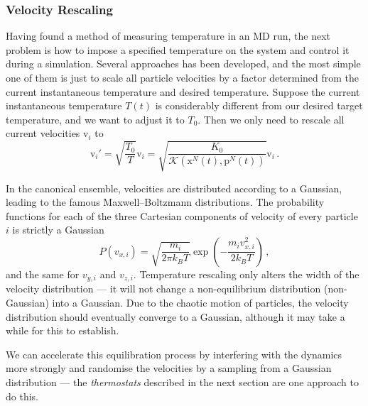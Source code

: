 \documentclass{article}
\theoremstyle{plain}\theoremheaderfont{\normalfont\itshape}\theorembodyfont{\rmfamily}\theoremseparator{.}\newtheorem*{rem}{Remark}\newtheorem*{ex}{Example}\newtheorem*{proof}{Proof}\newtheorem*{altp}{Alternative proof}
\theoremstyle{plain}\theoremheaderfont{\normalfont\bfseries}\theorembodyfont{\rmfamily}\theoremseparator{.}\newtheorem{thm}{Theorem}[section]\newtheorem{lem}[thm]{Lemma}\newtheorem{prop}[thm]{Proposition}\newtheorem*{cor}{Corollary}\newtheorem{defn}[thm]{Definition}\newtheorem{clm}[thm]{Claim}\newtheorem{clminproof}{Claim}\newtheorem{alg}[thm]{Algorithm}\newtheorem{hyp}[thm]{Hypothesis}\newtheorem{law}[thm]{Law}
\theoremstyle{break}\theoremheaderfont{\normalfont\itshape}\theorembodyfont{\rmfamily}\theoremseparator{.\medskip}\newtheorem*{proofskip}{Proof}\newtheorem*{exs}{Examples}\newtheorem*{rems}{Remarks}
\theoremstyle{break}\theoremheaderfont{\normalfont\bfseries}\theorembodyfont{\rmfamily}\theoremseparator{.\medskip}\newtheorem{lemskip}[thm]{Lemma}\newtheorem{defnskip}[thm]{Definition}\newtheorem{propskip}[thm]{Proposition}\newtheorem{thmskip}[thm]{Theorem}
\numberwithin{equation}{section}
\newcommand{\vb}[1]{\bm{\mathrm{#1}}}
\begin{document}
    \subsubsection{Velocity Rescaling}
    Having found a method of measuring temperature in an MD run, the next problem is how to impose a specified temperature on the system and control it during a simulation. Several approaches has been developed, and the most simple one of them is just to scale all particle velocities by a factor determined from the current instantaneous temperature and desired temperature. Suppose the current instantaneous temperature \(T(t)\) is considerably different from our desired target temperature, and we want to adjust it to \(T_0\). Then we only need to rescale all current velocities \(\vb{v}_i\) to
    \begin{equation}
        \vb{v}_i'=\sqrt{\frac{T_0}{T}}\vb{v}_i=\sqrt{\frac{K_0}{\mathcal{K}(\vb{x}^N(t),\vb{p}^N(t))}}\vb{v}_i\,.
    \end{equation}

    In the canonical ensemble, velocities are distributed according to a Gaussian, leading to the famous Maxwell--Boltzmann distributions. The probability functions for each of the three Cartesian components of velocity of every particle \(i\) is strictly a Gaussian
    \begin{equation}
        P(v_{x,i})=\sqrt{\frac{m_i}{2\pi k_B T}}\exp\left(-\frac{m_i v_{x,i}^2}{2k_B T}\right)\,,
    \end{equation}
    and the same for \(v_{y,i}\) and \(v_{z,i}\). Temperature rescaling only alters the width of the velocity distribution --- it will not change a non-equilibrium distribution (non-Gaussian) into a Gaussian. Due to the chaotic motion of particles, the velocity distribution should eventually converge to a Gaussian, although it may take a while for this to establish.

    We can accelerate this equilibration process by interfering with the dynamics more strongly and randomise the velocities by a sampling from a Gaussian distribution --- the \textit{thermostats} described in the next section are one approach to do this.
\end{document}
